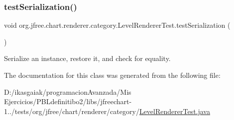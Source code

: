 \subsubsection{\texorpdfstring{test\+Serialization()}{testSerialization()}}
{\footnotesize\ttfamily void org.\+jfree.\+chart.\+renderer.\+category.\+Level\+Renderer\+Test.\+test\+Serialization (\begin{DoxyParamCaption}{ }\end{DoxyParamCaption})}

Serialize an instance, restore it, and check for equality. 

The documentation for this class was generated from the following file\+:\begin{DoxyCompactItemize}
\item 
D\+:/ikasgaiak/programacion\+Avanzada/\+Mis Ejercicios/\+P\+B\+Ldefinitibo2/libs/jfreechart-\/1../tests/org/jfree/chart/renderer/category/\mbox{\hyperlink{_level_renderer_test_8java}{Level\+Renderer\+Test.\+java}}\end{DoxyCompactItemize}
